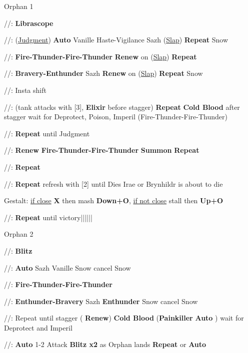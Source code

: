 \begin{fight}{Orphan 1}
	\item [2] \com/\com/\rav: \textbf{Librascope}
	\item [3] \syn/\sen/\med: (\underline{Judgment}) \to \textbf{Auto} Vanille \to Haste-Vigilance Sazh \to (\underline{Slap}) \to \textbf{Repeat} Snow
	\item [6] \rav/\rav/\rav: \textbf{Fire-Thunder-Fire-Thunder} \to \textbf{Renew} on (\underline{Slap}) \to \textbf{Repeat}
	\item [4] \syn/\rav/\rav: \textbf{Bravery-Enthunder} Sazh \to \textbf{Renew} on (\underline{Slap}) \to \textbf{Repeat} Snow
	\item [3] \syn/\sen/\med: Insta shift
	\item [5] \rav/\rav/\sab: (tank attacks with [3], \textbf{Elixir} before stagger) \textbf{Repeat} \to \textbf{Cold Blood} after stagger \to wait for Deprotect, Poison, Imperil (Fire-Thunder-Fire-Thunder)
	\item [1] \com/\com/\med: \textbf{Repeat} until Judgment
	\item [6] \rav/\rav/\rav: \textbf{Renew} \to \textbf{Fire-Thunder-Fire-Thunder} \to \textbf{Summon} \to \textbf{Repeat}
	\item [5] \rav/\rav/\sab: \textbf{Repeat}
	\item [1] \com/\com/\med: \textbf{Repeat} \to refresh with [2] until Dies Irae or Brynhildr is about to die
	\item Gestalt: \underline{if close} \textbf{X} then mash \textbf{Down+O}, \underline{if not close} stall then \textbf{Up+O}
	\item [1] \com/\com/\med: \textbf{Repeat} until victory|\skip|\skip|\skip|\skip|\skip|\skip
\end{fight}
\begin{fight}{Orphan 2}
	\item [2] \com/\com/\rav: \textbf{Blitz}
	\item [4] \syn/\rav/\rav: \textbf{Auto} Sazh \to Vanille \to Snow \to cancel Snow
	\item [6] \rav/\rav/\rav: \textbf{Fire-Thunder-Fire-Thunder}
	\item [4] \syn/\rav/\rav: \textbf{Enthunder-Bravery} Sazh \to \textbf{Enthunder} Snow \to cancel Snow
	\item [5] \rav/\rav/\sab: Repeat until stagger ( \to \textbf{Renew}) \to \textbf{Cold Blood} \to (\textbf{Painkiller} \to \textbf{Auto} \to ) wait for Deprotect and Imperil
	\item [1] \com/\com/\med: \textbf{Auto} 1-2 Attack \to \textbf{Blitz x2} as Orphan lands \to \textbf{Repeat} or \textbf{Auto}
\end{fight}
